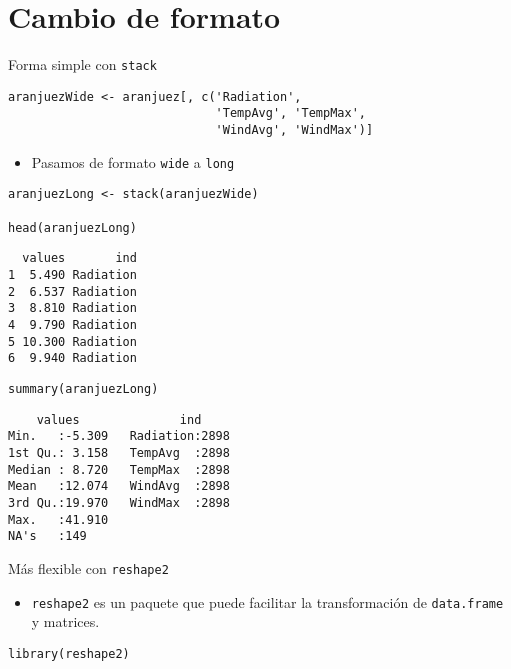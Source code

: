 \documentclass[xcolor={usenames,svgnames,dvipsnames}]{beamer}
\begin{document}
\section{Cambio de formato}
\label{sec-3}
\begin{frame}[fragile,label=sec-3-1]{Forma simple con \texttt{stack}}
 \lstset{language=R,label= ,caption= ,numbers=none}
\begin{lstlisting}
aranjuezWide <- aranjuez[, c('Radiation',
                             'TempAvg', 'TempMax',
                             'WindAvg', 'WindMax')]
\end{lstlisting}

\begin{itemize}
\item Pasamos de formato \texttt{wide} a \texttt{long}
\end{itemize}
\lstset{language=R,label= ,caption= ,numbers=none}
\begin{lstlisting}
aranjuezLong <- stack(aranjuezWide)

head(aranjuezLong)
\end{lstlisting}

\begin{verbatim}
  values       ind
1  5.490 Radiation
2  6.537 Radiation
3  8.810 Radiation
4  9.790 Radiation
5 10.300 Radiation
6  9.940 Radiation
\end{verbatim}

\lstset{language=R,label= ,caption= ,numbers=none}
\begin{lstlisting}
summary(aranjuezLong)
\end{lstlisting}

\begin{verbatim}
    values              ind      
Min.   :-5.309   Radiation:2898  
1st Qu.: 3.158   TempAvg  :2898  
Median : 8.720   TempMax  :2898  
Mean   :12.074   WindAvg  :2898  
3rd Qu.:19.970   WindMax  :2898  
Max.   :41.910                   
NA's   :149
\end{verbatim}
\end{frame}

\begin{frame}[fragile,label=sec-3-2]{Más flexible con \texttt{reshape2}}
 \begin{itemize}
\item \texttt{reshape2} es un paquete que puede facilitar la transformación de \texttt{data.frame} y matrices.
\end{itemize}

\lstset{language=R,label= ,caption= ,numbers=none}
\begin{lstlisting}
library(reshape2)
\end{lstlisting}
\end{frame}
\end{document}
